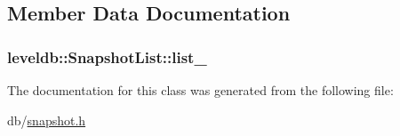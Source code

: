 \subsection{Member Data Documentation}
\hypertarget{classleveldb_1_1_snapshot_list_a7c45d05759fcc3853c140816da181b0c}{}
\subsubsection[{list\+\_\+}]{ leveldb\+::\+Snapshot\+List\+::list\+\_\+\hspace{0.3cm}{\ttfamily [private]}}\label{classleveldb_1_1_snapshot_list_a7c45d05759fcc3853c140816da181b0c}


The documentation for this class was generated from the following file\+:\begin{DoxyCompactItemize}
\item 
db/\hyperlink{snapshot_8h}{snapshot.\+h}\end{DoxyCompactItemize}
